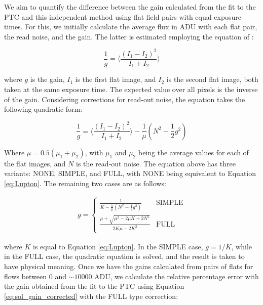 \vspace{3mm}
We aim to quantify the difference between the gain calculated from the fit to the PTC and this independent method using flat field pairs with equal exposure times. For this, we initially calculate the average flux in ADU with each flat pair, the read noise, and the gain. The latter is estimated employing the equation of \cite{lupton2014consequences}:

\begin{equation}
    \frac{1}{g} = \Big \langle \frac{(I_1 - I_2)^2}{I_1 + I_2} \Big \rangle 
    \label{eq:Lupton}
\end{equation}

where $g$ is the gain, $I_1$ is the first flat image, and $I_2$ is the second flat image, both taken at the same exposure time. The expected value over all pixels is the inverse of the gain. Considering corrections for read-out noise, the equation takes the following quadratic form:

\begin{equation}
    \frac{1}{g} = \Big \langle \frac{(I_1 - I_2)^2}{I_1 + I_2} \Big \rangle - \frac{1}{\mu} (N^2-\frac{1}{2} g^2)
    \label{eq:gain_corrected}
\end{equation}

Where $\mu = 0.5(\mu_1 + \mu_2)$, with $\mu_1$ and $\mu_2$ being the average values for each of the flat images, and $N$ is the read-out noise. The equation above has three variants: NONE, SIMPLE, and FULL, with NONE being equivalent to Equation \ref{eq:Lupton}. The remaining two cases are as follows:

\begin{align}
g = \begin{cases}
  \frac{1}{K - \frac{1}{\mu}(N^2 - \frac{1}{2} g^2)} & \mbox{SIMPLE} \\
  \frac{\mu + \sqrt{\mu^2 - 2 \mu K + 2 N^2}}{2 K \mu - 2 K^2} & \mbox{FULL}
\end{cases}
\label{eq:sol_gain_corrected}
\end{align}

where $K$ is equal to Equation \ref{eq:Lupton}. In the SIMPLE case, $g = 1/K$, while in the FULL case, the quadratic equation is solved, and the result is taken to have physical meaning. Once we have the gains calculated from pairs of flats for flows between 0 and $\sim 10000$ ADU, we calculate the relative percentage error with the gain obtained from the fit to the PTC using Equation \ref{eq:sol_gain_corrected} with the FULL type correction:

